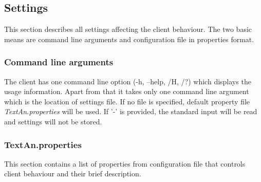 \documentclass[12pt,a4paper]{report}
\begin{document}
\subsection{Settings}

This section describes all settings affecting the client behaviour.
The two basic means are command line arguments and configuration file in properties format.

\subsubsection{Command line arguments}
\label{ssec:CliCmdArg}

The client has one command line option (-h, --help, /H, /?) which displays the usage information.
Apart from that it takes only one command line argument which is the location of settings file.
If no file is specified, default property file \emph{TextAn.properties} will be used.
If '-' is provided, the standard input will be read and settings will not be stored.

\subsubsection{TextAn.properties}

This section contains a list of properties from configuration file that controls
client behaviour and their brief description.
\end{document}
